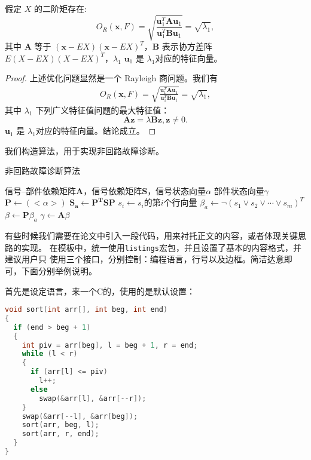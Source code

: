 \begin{theorem}
  \label{chapTSthm:rayleigh solution}
  假定 $X$ 的二阶矩存在:
  \begin{equation}
         O_R(\textbf{x},F)=\sqrt{\frac{\textbf{u}_1^T\textbf{A}\textbf{u}_1} {\textbf{u}_1^T\textbf{B}\textbf{u}_1}}=\sqrt{\lambda_1},
  \end{equation}
  其中 $\textbf{A}$ 等于 $(\textbf{x}-EX)(\textbf{x}-EX)^T$，\textbf{B} 表示协方差阵 $E(X-EX)(X-EX)^T$，$\lambda_1$
$\textbf{u}_1$ 是 $\lambda_1$对应的特征向量。
\end{theorem}

\begin{proof}
 上述优化问题显然是一个 Rayleigh 商问题。我们有
  \begin{align}
     O_R(\textbf{x},F)=\sqrt{\frac{\textbf{u}_1^T\textbf{A}\textbf{u}_1} {\textbf{u}_1^T\textbf{B}\textbf{u}_1}}=\sqrt{\lambda_1},
 \end{align}
 其中 $\lambda_1$ 下列广义特征值问题的最大特征值：
$$
\textbf{A}\textbf{z}=\lambda\textbf{B}\textbf{z}, \textbf{z}\neq 0.
$$
 $\textbf{u}_1$ 是 $\lambda_1$对应的特征向量。结论成立。
\end{proof}
我们构造算法，用于实现非回路故障诊断。

\begin{algorithm}[htbp]
  \caption{非回路故障诊断算法}
  \label{alg53}
  \begin{algorithmic}[1]
    \REQUIRE 信号--部件依赖矩阵$\mathbf{A}$，信号依赖矩阵$\mathbf{S}$，信号状态向量$\alpha$
    \ENSURE 部件状态向量$\gamma$
    \STATE $\mathbf{P}\leftarrow\left(<\alpha>\right)$
    \STATE $\mathbf{S_{a}}\leftarrow\mathbf{P^T}\mathbf{S}\mathbf{P}$
    \STATE $s_i\leftarrow s_i$的第$i$个行向量
    \ENDFOR
    \STATE $\beta_a\leftarrow\lnot \left(s_1\lor s_2\lor \cdots\lor s_m\right)^T$
    \STATE $\beta\leftarrow\mathbf{P}\beta_a$
    \STATE $\gamma\leftarrow\mathbf{A}\beta$
  \end{algorithmic}
\end{algorithm}

有些时候我们需要在论文中引入一段代码，用来衬托正文的内容，或者体现关键思路的实现。
在模板中，统一使用\texttt{listings}宏包，并且设置了基本的内容格式，并建议用户只
使用三个接口，分别控制：编程语言，行号以及边框。简洁达意即可，下面分别举例说明。

首先是设定语言，来一个C的，使用的是默认设置：
\begin{lstlisting}[language=C]
void sort(int arr[], int beg, int end)
{
  if (end > beg + 1)
  {
    int piv = arr[beg], l = beg + 1, r = end;
    while (l < r)
    {
      if (arr[l] <= piv)
        l++;
      else
        swap(&arr[l], &arr[--r]);
    }
    swap(&arr[--l], &arr[beg]);
    sort(arr, beg, l);
    sort(arr, r, end);
  }
}
\end{lstlisting}

